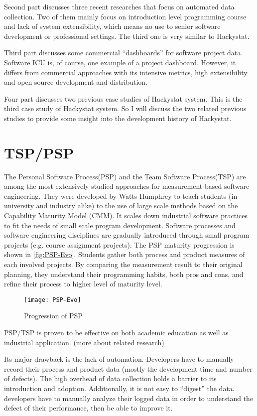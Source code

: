 Second part discusses three recent researches that focus on automated data collection. Two of them mainly focus on introduction level programming course and lack of system extensibility, which means no use to senior software development or professional settings. The third one is very similar to Hackystat.

Third part discusses some commercial ``dashboards'' for software project data. Software ICU is, of course, one example of a project dashboard. However, it differs from commercial approaches with its intensive metrics, high extensibility and open source development and distribution. 

Four part discusses two previous case studies of Hackystat system. This is the third case study of Hackystat system. So I will discuss the two related previous studies to provide some insight into the development history of Hackystat.

\section {TSP/PSP}
The Personal Software Process(PSP)\cite{book:psp} and the Team Software Process(TSP)\cite{book:tsp} are among the most extensively studied approaches for measurement-based software engineering. They were developed by Watts Humphrey to teach students (in university and industry alike) to the use of large scale methods based on the Capability Maturity Model (CMM). It scales down industrial software practices to fit the needs of small scale program development. Software processes and software engineering disciplines are gradually introduced through small program projects (e.g. course assignment projects). The PSP maturity progression is shown in \autoref{fig:PSP-Evo}. Students gather both process and product measures of each involved projects. By comparing the measurement result to their original planning, they understand their programming habits, both pros and cons, and refine their process to higher level of maturity level.

\begin{figure}[htbp] %
   \centering
   \texttt{[image: PSP-Evo]} 
   \caption{Progression of PSP}
   \label{fig:PSP-Evo}
\end{figure}

PSP/TSP is proven to be effective on both academic education as well as industrial application. (more about related research)

Its major drawback is the lack of automation. Developers have to manually record their process and product data (mostly the development time and number of defects). The high overhead of data collection holds a barrier to its introduction and adoption. Additionally, it is not easy to ``digest'' the data. developers have to manually analyze their logged data in order to understand the defect of their performance, then be able to improve it.

